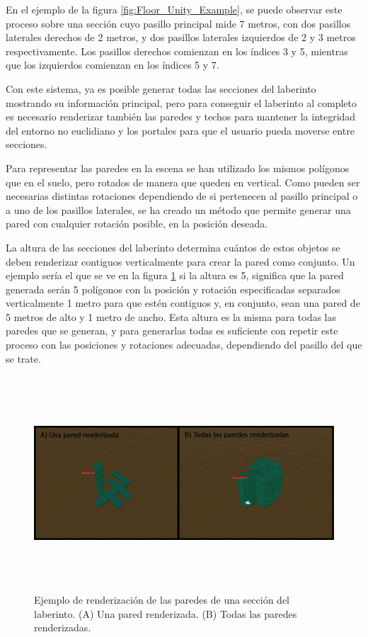 \documentclass[../main.tex]{subfiles}
\begin{document}
En el ejemplo de la figura \ref{fig:Floor_Unity_Example}, se puede observar este proceso sobre una sección cuyo pasillo principal mide 7 metros, con dos pasillos laterales derechos de 2 metros, y dos pasillos laterales izquierdos de 2 y 3 metros respectivamente. Los pasillos derechos comienzan en los índices 3 y 5, mientras que los izquierdos comienzan en los índices 5 y 7.

Con este sistema, ya es posible generar todas las secciones del laberinto mostrando su información principal, pero para conseguir el laberinto al completo es necesario renderizar también las paredes y techos para mantener la integridad del entorno no euclidiano y los portales para que el usuario pueda moverse entre secciones.

Para representar las paredes en la escena se han utilizado los mismos polígonos que en el suelo, pero rotados de manera que queden en vertical. Como pueden ser necesarias distintas rotaciones dependiendo de si pertenecen al pasillo principal o a uno de los pasillos laterales, se ha creado un método que permite generar una pared con cualquier rotación posible, en la posición deseada. 

La altura de las secciones del laberinto determina cuántos de estos objetos se deben renderizar contiguos verticalmente para crear la pared como conjunto. Un ejemplo sería el que se ve en la figura \ref{fig:Wall_Unity_Example} si la altura es 5, significa que la pared generada serán 5 polígonos con la posición y rotación especificadas separados verticalmente 1 metro para que estén contiguos y, en conjunto, sean una pared de 5 metros de alto y 1 metro de ancho. Esta altura es la misma para todas las paredes que se generan, y para generarlas todas es suficiente con repetir este proceso con las posiciones y rotaciones adecuadas, dependiendo del pasillo del que se trate.

\begin{figure}[h!]
\hspace{-1.5cm}
\includegraphics[width=16cm, height=8cm]{imagenes/Wall_Rendering.png}
\caption{Ejemplo de renderización de las paredes de una sección del laberinto. (A) Una pared renderizada. (B) Todas las paredes renderizadas.}
\label{fig:Wall_Unity_Example}
\end{figure}
\end{document}
